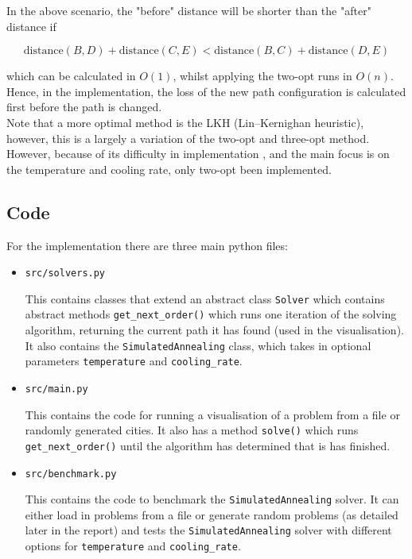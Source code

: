 \documentclass{article}
\begin{document}
In the above scenario, the "before" distance will be shorter than the "after" distance if

$$\text{distance}(B, D) + \text{distance}(C, E) < \text{distance}(B, C) + \text{distance}(D, E)$$

which can be calculated in $O(1)$, whilst applying the two-opt runs in $O(n)$.
Hence, in the implementation, the loss of the new path configuration is calculated first before the path is changed. \\

Note that a more optimal method is the LKH (Lin–Kernighan heuristic), however, this is a largely a variation of the two-opt and three-opt method.
However, because of its difficulty in implementation \cite{helsgaun98}, and the main focus is on the temperature and cooling rate, only two-opt been implemented.

\subsection{Code}

For the implementation there are three main python files:

\begin{itemize}
    \item \texttt{src/solvers.py} 
    
    This contains classes that extend an abstract class \texttt{Solver} which contains abstract methods \texttt{get\_next\_order()} which runs one iteration of the solving algorithm, returning the current path it has found (used in the visualisation).
    It also contains the \texttt{SimulatedAnnealing} class, which takes in optional parameters \texttt{temperature} and \texttt{cooling\_rate}.
    
    \item \texttt{src/main.py} 
    
    This contains the code for running a visualisation of a problem from a file or randomly generated cities.
    It also has a method \texttt{solve()} which runs \texttt{get\_next\_order()} until the algorithm has determined that is has finished.
    
    \item \texttt{src/benchmark.py}
    
    This contains the code to benchmark the \texttt{SimulatedAnnealing} solver.
    It can either load in problems from a file or generate random problems (as detailed later in the report) and tests the \texttt{SimulatedAnnealing} solver with different options for \texttt{temperature} and \texttt{cooling\_rate}.

\end{itemize}
\end{document}

